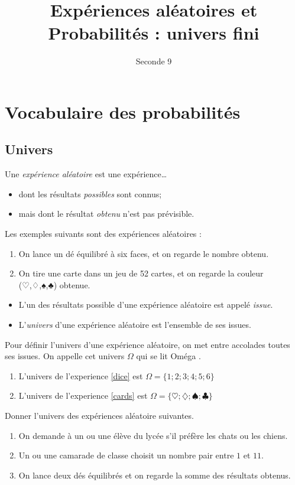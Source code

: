 \documentclass{article}
\title{Expériences aléatoires et Probabilités : univers fini}
\author{Seconde 9}
\date{}
\begin{document}
\maketitle
\section{Vocabulaire des probabilités}
\subsection{Univers}
\begin{definition}
Une \emph{expérience aléatoire} est une expérience\dots
\begin{itemize}
\item dont les résultats \emph{possibles} sont connus;
\item mais dont le résultat \emph{obtenu} n'est pas prévisible.
\end{itemize}
\end{definition}
\begin{example} Les exemples suivants sont des expériences aléatoires :
\begin{enumerate}
\item On lance un dé équilibré à six faces, et on regarde le nombre obtenu.
\label{dice}
\item On tire une carte dans un jeu de 52 cartes, et on regarde la couleur (♡,♢,♠,♣) obtenue. 
\label{cards}
\end{enumerate}
\end{example}
\begin{definition}
\begin{itemize}
\item L'un des résultats possible d'une expérience aléatoire est appelé \emph{issue}.
\item L'\emph{univers} d'une expérience aléatoire est l'ensemble de ses issues.
\end{itemize}
\end{definition}
\begin{example}
Pour définir l'univers d'une expérience aléatoire, on met entre accolades toutes ses issues. On appelle cet univers $\Omega$ qui se lit \og Oméga \fg.
\begin{enumerate}
\item L'univers de l'experience \ref{dice} est $\Omega = \{1;2;3;4;5;6\}$ 
\item L'univers de l'experience \ref{cards} est $\Omega = \{♡;♢;♠;♣\}$ 
\end{enumerate}    
\end{example}
\begin{exercize}
Donner l'univers des expériences aléatoire suivantes.
\begin{enumerate}[label=\alph*)]
\item On demande à un ou une élève du lycée s'il préfère les chats ou les chiens.
\item Un ou une camarade de classe choisit un nombre pair entre $1$ et $11$.
\item On lance deux dés équilibrés et on regarde la somme des résultats obtenus.
\end{enumerate}
\end{exercize}
\emptybox{7cm}
\newpage
\end{document}
